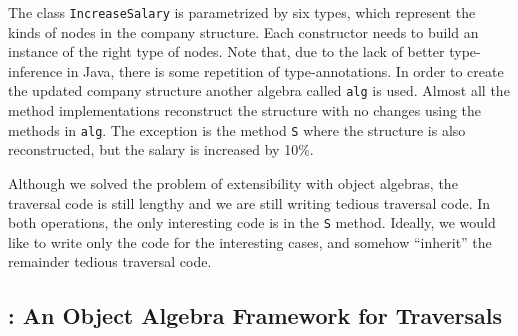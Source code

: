 The class \lstinline{IncreaseSalary} is parametrized by six types,
which represent the kinds of nodes in the company structure. Each
constructor needs to build an instance of the right type of nodes.
Note that, due to the lack of better type-inference in Java, there is
some repetition of type-annotations. In order to create the updated
company structure another algebra called \lstinline{alg} is used.
Almost all the method implementations reconstruct the structure with
no changes using the methods in \lstinline{alg}. The exception is the
method \lstinline{S} where the structure is also reconstructed, but
the salary is increased by 10\%.



Although we solved the problem of extensibility with object
algebras, the traversal code is still lengthy and we are still writing
tedious traversal code. In both operations, the only interesting code 
is in the \lstinline{S} method. Ideally, we would like to write only
the code for the interesting cases, and somehow ``inherit'' the
remainder tedious traversal code.


\subsection{\Name: An Object Algebra Framework for Traversals}

